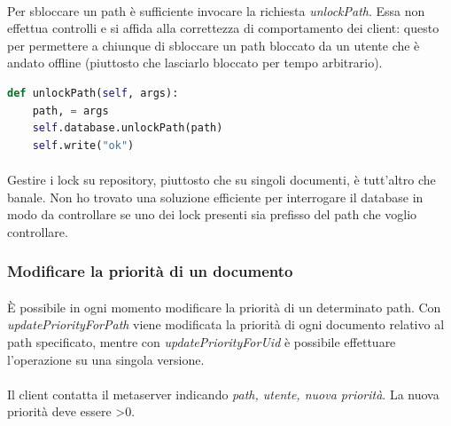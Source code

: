 \documentclass[11pt,a4paper,english]{article}
\begin{document}
\paragraph{} Per sbloccare un path è sufficiente invocare la richiesta \emph{unlockPath}. Essa non effettua controlli e si affida alla correttezza di comportamento dei client: questo per permettere a chiunque di sbloccare un path bloccato da un utente che è andato offline (piuttosto che lasciarlo bloccato per tempo arbitrario). 

\begin{lstlisting}[language=Python, title=Metaserver]
def unlockPath(self, args):
    path, = args
    self.database.unlockPath(path)
    self.write("ok")
\end{lstlisting}

\paragraph{} Gestire i lock su repository, piuttosto che su singoli documenti, è tutt'altro che banale. Non ho trovato una soluzione efficiente per interrogare il database in modo da controllare se uno dei lock presenti sia prefisso del path che voglio controllare. 

\subsubsection{Modificare la priorità di un documento}

\paragraph{} È possibile in ogni momento modificare la priorità di un determinato path. Con \emph{updatePriorityForPath} viene modificata la priorità di ogni documento relativo al path specificato, mentre con \emph{updatePriorityForUid} è possibile effettuare l'operazione su una singola versione. 

\paragraph{} Il client contatta il metaserver indicando \emph{path, utente, nuova priorità}. La nuova priorità deve essere >0. 
\end{document}
